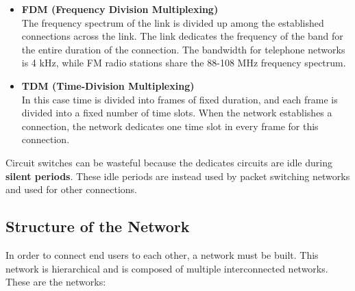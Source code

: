 \documentclass{article}
\begin{document}
\begin{itemize}
	\item \textbf{FDM (Frequency Division Multiplexing)}
	\vspace{.2cm} \\
	The frequency spectrum of the link is divided up among the established connections across the link. The link dedicates the frequency of the band for the entire duration of the connection. The bandwidth for telephone networks is 4 kHz, while FM radio stations share the 88-108 MHz frequency spectrum.
	
	\item \textbf{TDM (Time-Division Multiplexing)}
	\vspace{.2cm} \\
	In this case time is divided into frames of fixed duration, and each frame is divided into a fixed number of time slots. When the network establishes a connection, the network dedicates one time slot in every frame for this connection. 
\end{itemize}
Circuit switches can be wasteful because the dedicates circuits are idle during \textbf{silent periods}. These idle periods are instead used by packet switching networks and used for other connections.

\subsection{Structure of the Network}
In order to connect end users to each other, a network must be built. This network is hierarchical and is composed of multiple interconnected networks. These are the networks:
\end{document}
